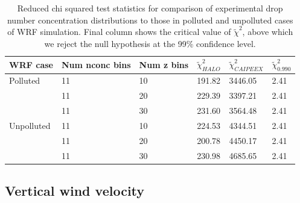 \documentclass{article}
\begin{document}
\begin{table}[ht]
\centering
\begin{tabular}{@{}llllll@{}}
\toprule
\textbf{WRF case} & \textbf{Num nconc bins} & \textbf{Num z bins} & \textbf{$\tilde\chi^2_{HALO}$} & \textbf{$\tilde\chi^2_{CAIPEEX}$} & \textbf{$\tilde\chi^2_{0.990}$} \\ \midrule
Polluted & 11 & 10 & 191.82 & 3446.05 & 2.41 \\
 & 11 & 20 & 229.39 & 3397.21 & 2.41 \\
 & 11 & 30 & 231.60 & 3564.48 & 2.41 \\
Unpolluted & 11 & 10 & 224.53 & 4344.51 & 2.41 \\
 & 11 & 20 & 200.78 & 4450.17 & 2.41 \\
 & 11 & 30 & 230.98 & 4685.65 & 2.41 \\ \bottomrule
\end{tabular}
\caption{Reduced chi squared test statistics for comparison of experimental drop number concentration distributions to those in polluted and unpolluted cases of WRF simulation. Final column shows the critical value of $\tilde\chi^2$, above which we reject the null hypothesis at the 99\% confidence level.}
\label{chisqnconc}
\end{table}

\clearpage
\newpage

\subsection{Vertical wind velocity}
\end{document}
